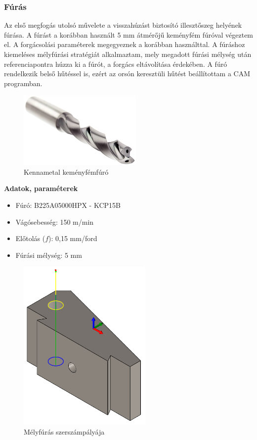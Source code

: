 \documentclass[12pt,a4paper,oneside]{report}
\begin{document}
\subsubsection{Fúrás}
Az első megfogás utolsó művelete a visszahúzást biztosító illesztőszeg helyének fúrása. A fúrást a korábban használt 5 mm átmérőjű keményfém fúróval végeztem el. A forgácsolási paraméterek megegyeznek a korábban használttal. A fúráshoz kiemeléses mélyfúrási stratégiát alkalmaztam, mely megadott fúrási mélység után referenciapontra húzza ki a fúrót, a forgács eltávolítása érdekében. A fúró rendelkezik belső hűtéssel is, ezért az orsón keresztüli hűtést beállítottam a CAM programban.

\begin{figure}[H]
    \centering
    \includegraphics[width=6cm]{figures/d5_drill.png}
    \caption{Kennametal keményfémfúró}
    \label{Fig:d5_drill}
\end{figure}

\textbf{Adatok, paraméterek}
\begin{itemize}
    \item Fúró: B225A05000HPX - KCP15B
    \item Vágósebesség: 150 m/min
    \item Előtolás ($f$): 0,15 mm/ford
    \item Fúrási mélység: 5 mm
\end{itemize}

\begin{figure}[H]
    \centering
    \includegraphics[width=6.5cm]{figures/alaptest_drill.png}
    \caption{Mélyfúrás szerszámpályája}
    \label{Fig:alaptest_drill}
\end{figure}
\end{document}
